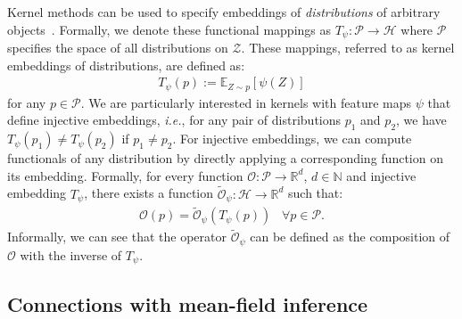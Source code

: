 \documentclass{article}
\begin{document}
Kernel methods can be used to specify embeddings of \textit{distributions} of arbitrary objects~\citep{smola2007hilbert,gretton2007kernel}. 
Formally, we denote these functional mappings as $T_{\psi}: \mathcal{P} \rightarrow \mathcal{H}$ where $\mathcal{P}$ specifies the space of all distributions on $\mathcal{Z}$. 
These mappings, referred to as kernel embeddings of distributions, are defined as:
\begin{align}
T_{\psi}(p) := \mathbb{E}_{Z\sim p}[\psi(Z)]
\end{align}
for any $p \in \mathcal{P}$.
We are particularly interested in kernels with feature maps $\psi$ that define injective embeddings, \textit{i.e.}, for any pair of distributions $p_1$ and $p_2$, we have $T_{\psi}(p_1)\neq T_{\psi}(p_2)$ if $p_1 \neq p_2$. 
For injective embeddings, 
we can compute functionals of any distribution by directly applying a corresponding function on its embedding. Formally, for every function $\mathcal{O}:\mathcal{P}\rightarrow \mathbb{R}^d$, $ d\in \mathbb{N}$ and injective embedding $T_{\psi}$, there exists a function $\tilde{\mathcal{O}}_{\psi}:\mathcal{H}\rightarrow \mathbb{R}^d$ such that:
\begin{align}\label{eq:kernel_op}
\mathcal{O}(p) = \tilde{\mathcal{O}}_{\psi}(T_{\psi}(p)) \;\;\; \forall p \in \mathcal{P}.
\end{align}
Informally, we can see that the operator $\tilde{\mathcal{O}}_{\psi}$ can be defined as the composition of $\mathcal{O}$ with the inverse of $T_{\psi}$.


\subsection{Connections with mean-field inference}
\end{document}
